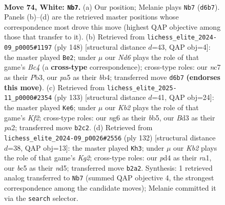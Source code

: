 \documentclass[11pt]{article}
\begin{document}
\clearpage

\begin{figure}[p]\centering
\begin{subfigure}{0.46\textwidth}\centering
\resizebox{\linewidth}{!}{%
\newchessgame
\chessboard[
  setfen={8/2n5/3N2nk/p1b5/P2pP3/1P1B3p/1K2P3/8 w - - 14 74},
  showmover=false,
  pgfstyle=straightmove, color=movearrow, markmove={d6-b7}
]}
\caption{}
\end{subfigure}\hfill
\begin{subfigure}{0.46\textwidth}\centering
\resizebox{\linewidth}{!}{%
\newchessgame
\chessboard[
  setfen={3B2n1/8/4P3/p7/1bBkp1p1/1P6/5P2/5K2 w - - 9 75},
  showmover=false,
  pgfstyle=straightmove, color=movearrow, markmove={c4-e2}
]}
\caption{}
\end{subfigure}
\\[4pt]
\begin{subfigure}{0.46\textwidth}\centering
\resizebox{\linewidth}{!}{%
\newchessgame
\chessboard[
  setfen={1n6/1P3k2/1N1p4/KBb1p3/4P3/p4P2/P7/8 b - - 30 67},
  showmover=false,
  pgfstyle=straightmove, color=movearrow, markmove={f7-e6}
]}
\caption{}
\end{subfigure}\hfill
\begin{subfigure}{0.46\textwidth}\centering
\resizebox{\linewidth}{!}{%
\newchessgame
\chessboard[
  setfen={2R5/4k3/1B1p4/P2npp2/8/6P1/5PK1/r7 w - - 18 67},
  showmover=false,
  pgfstyle=straightmove, color=movearrow, markmove={g2-h3}
]}
\caption{}
\end{subfigure}
\caption{\textbf{Move 74, White: \texttt{Nb7}.} (a) Our position; Melanie plays \texttt{Nb7} (\texttt{d6b7}). Panels (b)--(d) are the retrieved master positions whose correspondence most drove this move (highest QAP objective among those that transfer to it). (b) Retrieved from \texttt{lichess\_elite\_2024-09\_p0005\#1197} (ply 148) [structural distance $d$=43, QAP obj=4]: the master played \texttt{Be2}; under $\mu$ our \emph{Nd6} plays the role of that game's \emph{Bc4} (a \textbf{cross-type} correspondence); cross-type roles: our \emph{n}c7 as their \emph{P}b3, our \emph{p}a5 as their \emph{b}b4; transferred move \texttt{d6b7} \textbf{(endorses this move)}. (c) Retrieved from \texttt{lichess\_elite\_2025-11\_p0000\#2354} (ply 133) [structural distance $d$=41, QAP obj=24]: the master played \texttt{Ke6}; under $\mu$ our \emph{Kb2} plays the role of that game's \emph{Kf2}; cross-type roles: our \emph{n}g6 as their \emph{b}b5, our \emph{B}d3 as their \emph{p}a2; transferred move \texttt{b2c2}. (d) Retrieved from \texttt{lichess\_elite\_2024-09\_p0026\#2556} (ply 132) [structural distance $d$=38, QAP obj=13]: the master played \texttt{Kh3}; under $\mu$ our \emph{Kb2} plays the role of that game's \emph{Kg2}; cross-type roles: our \emph{p}d4 as their \emph{r}a1, our \emph{b}c5 as their \emph{n}d5; transferred move \texttt{b2a2}. Synthesis: 1 retrieved analog transferred to \texttt{Nb7} (summed QAP objective 4, the strongest correspondence among the candidate moves); Melanie committed it via the \texttt{search} selector.}
\label{fig:thought-m146}
\end{figure}
\end{document}
